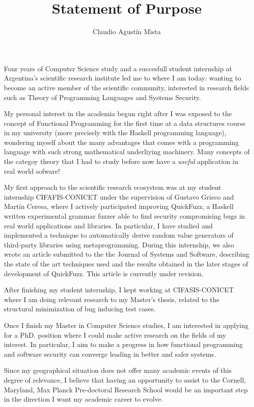 \documentclass[helvetica,openbib,logo,notitle,flagCMYK,totpages]{europecv}
\title{Statement of Purpose}
\author{Claudio Agust\'in Mista}
\date{}
\begin{document}

\maketitle 
   
    Four years of Computer Science study and a succesfull student internship at
    Argentina's scientific research institute led me to where I am today:
    wanting to become an active member of the scientific community, interested
    in research fields such as Theory of Programming Languages and Systems
    Security. 

    My personal interest in the academia begun right after I was exposed to the
    concept of Functional Programming for the first time at a data structures
    course in my university (more precisely with the Haskell programming
    language), wondering myself about the many advantages that comes with a
    programming language with such strong mathematical underliying machinery.
    Many concepts of the categoy theory that I had to study before now have a
    \emph{useful} application in real world sofware! 

    My first approach to the scientific research ecosystem was at my student
    internship CIFAFIS-CONICET under the supervision of Gustavo Grieco and
    Mart\'in Ceresa, where I actively participated improving QuickFuzz, a
    Haskell written experimental grammar fuzzer able to find security
    compromising bugs in real world applications and libraries. In particular,
    I have studied and implemented a technique to automatically derive random
    value generators of third-party libraries using metaprogramming. During
    this internship, we also wrote an article submitted to the the Journal of
    Systems and Software, describing the state of the art techniques used and
    the results obtained in the later stages of development of QuickFuzz. This
    article is currently under revision. 

    After finishing my student internship, I kept working at CIFASIS-CONICET
    where I am doing relevant research to my Master's thesis, related to the
    structural minimization of bug inducing test cases.   

    Once I finish my Master in Computer Science studies, I am interested in
    applying for a PhD. position where I could make active research on the
    fields of my interest. In particular, I aim to make a progress in how
    functional programming and software security can converge leading in better
    and safer systems. 

    Since my geographical situation does not offer many academic events of this
    degree of relevance, I believe that having an opportunity to assist to the
    Cornell, Maryland, Max Planck Pre-doctoral Research School would be an
    important step in the direction I want my academic career to evolve.
\end{document}
